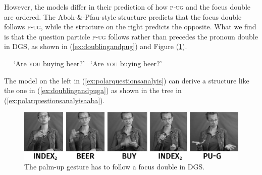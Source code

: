 However, the models differ in their prediction of how \textsc{p-ug} and the focus double are ordered. The Aboh-\&-Pfau-style structure predicts that the focus double follows \textsc{p-ug}, while the structure on the right predicts the opposite. What we find is that the question particle \textsc{p-ug} follows rather than precedes the pronoun double in DGS, as shown in (\ref{ex:doublingandpug}) and Figure (\ref{fig:beerbuyyou}).




\begin{exe}
\ex\label{ex:doublingandpug}\begin{xlist}
\ex \textcolor{white}{*}
\glt \textcolor{white}{*}`Are \textsc{you} buying beer?' \label{ex:doublingandpuga}
\ex *
\glt \textcolor{white}{*}`Are \textsc{you} buying beer?' \label{ex:doublingandpugb}
\end{xlist}
\end{exe}

\noindent The model on the left in (\ref{ex:polarquestionsanalyis}) can derive a structure like the one in (\ref{ex:doublingandpuga}) as shown in the tree in (\ref{ex:polarquestionsanalyisaaba}).

\begin{figure}[b]
\centering
	\includegraphics[width=1.0\textwidth]{beerbuyyousw.jpg}
	\caption{The palm-up gesture has to follow a focus double in DGS.}
	\label{fig:beerbuyyou}
\end{figure}

%

